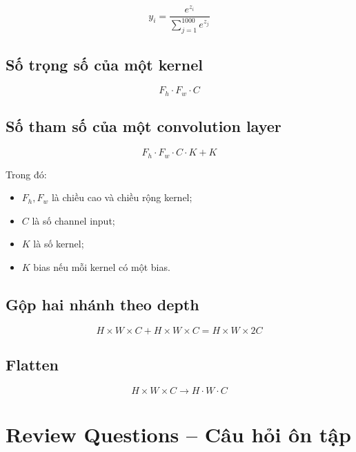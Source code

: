 \[
    y_i =
    \frac{e^{z_i}}
    {\sum_{j=1}^{1000}e^{z_j}}
\]

\subsection*{Số trọng số của một kernel}

\[
    F_h\cdot F_w\cdot C
\]

\subsection*{Số tham số của một convolution layer}

\[
    F_h\cdot F_w\cdot C\cdot K + K
\]

Trong đó:

\begin{itemize}
    \item $F_h,F_w$ là chiều cao và chiều rộng kernel;
    \item $C$ là số channel input;
    \item $K$ là số kernel;
    \item $K$ bias nếu mỗi kernel có một bias.
\end{itemize}

\subsection*{Gộp hai nhánh theo depth}

\[
    H\times W\times C
    +
    H\times W\times C
    =
    H\times W\times 2C
\]

\subsection*{Flatten}

\[
    H\times W\times C
    \rightarrow
    H\cdot W\cdot C
\]

\section{Review Questions -- Câu hỏi ôn tập}

